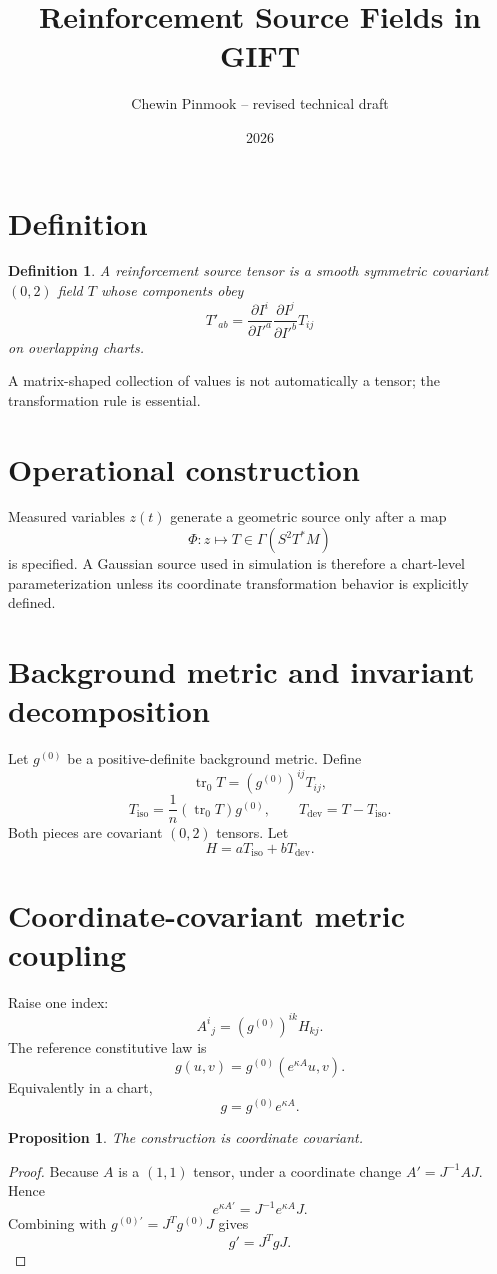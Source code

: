 \documentclass[11pt]{article}
\title{Reinforcement Source Fields in GIFT}
\author{Chewin Pinmook -- revised technical draft}
\date{2026}
\newtheorem{definition}{Definition}
\newtheorem{proposition}{Proposition}
\begin{document}
\maketitle

\section{Definition}
\begin{definition}
A reinforcement source tensor is a smooth symmetric covariant $(0,2)$ field $T$ whose components obey
\[
T'_{ab}=
\frac{\partial I^i}{\partial I'^a}
\frac{\partial I^j}{\partial I'^b}
T_{ij}
\]
on overlapping charts.
\end{definition}
A matrix-shaped collection of values is not automatically a tensor; the transformation rule is essential.

\section{Operational construction}
Measured variables $z(t)$ generate a geometric source only after a map
\[
\Phi:z\longmapsto T\in\Gamma(S^2T^*M)
\]
is specified. A Gaussian source used in simulation is therefore a chart-level parameterization unless its coordinate transformation behavior is explicitly defined.

\section{Background metric and invariant decomposition}
Let $g^{(0)}$ be a positive-definite background metric. Define
\[
\operatorname{tr}_0T=(g^{(0)})^{ij}T_{ij},
\]
\[
T_{\mathrm{iso}}=\frac{1}{n}(\operatorname{tr}_0T)g^{(0)},\qquad
T_{\mathrm{dev}}=T-T_{\mathrm{iso}}.
\]
Both pieces are covariant $(0,2)$ tensors. Let
\[
H=aT_{\mathrm{iso}}+bT_{\mathrm{dev}}.
\]

\section{Coordinate-covariant metric coupling}
Raise one index:
\[
A^i{}_j=(g^{(0)})^{ik}H_{kj}.
\]
The reference constitutive law is
\[
\boxed{
g(u,v)=g^{(0)}(e^{\kappa A}u,v).
}
\]
Equivalently in a chart,
\[
g=g^{(0)}e^{\kappa A}.
\]

\begin{proposition}
The construction is coordinate covariant.
\end{proposition}
\begin{proof}
Because $A$ is a $(1,1)$ tensor, under a coordinate change $A'=J^{-1}AJ$. Hence
\[
e^{\kappa A'}=J^{-1}e^{\kappa A}J.
\]
Combining with $g^{(0)\prime}=J^Tg^{(0)}J$ gives
\[
g'=J^TgJ.
\]
\end{proof}
\end{document}
